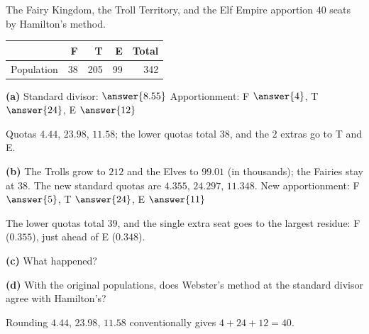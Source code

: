 \documentclass[12pt]{ximera}
\begin{document}
\begin{problem}
The Fairy Kingdom, the Troll Territory, and the Elf Empire apportion $40$ seats by
Hamilton's method.
\begin{center}
\begin{tabular}{r|rrrr}
 & F & T & E & Total\\\hline
Population & 38 & 205 & 99 & 342
\end{tabular}
\end{center}

\begin{prompt}
\textbf{(a)} Standard divisor: $\answer{8.55}$ \qquad Apportionment: F $\answer{4}$,
T $\answer{24}$, E $\answer{12}$
\begin{feedback}
Quotas $4.44$, $23.98$, $11.58$; the lower quotas total $38$, and the $2$ extras go to T
and E.
\end{feedback}
\end{prompt}

\begin{prompt}
\textbf{(b)} The Trolls grow to $212$ and the Elves to $99.01$ (in thousands); the Fairies
stay at $38$. The new standard quotas are $4.355$, $24.297$, $11.348$. New apportionment:
F $\answer{5}$, T $\answer{24}$, E $\answer{11}$
\begin{feedback}
The lower quotas total $39$, and the single extra seat goes to the largest residue: F
($0.355$), just ahead of E ($0.348$).
\end{feedback}
\end{prompt}

\begin{prompt}
\textbf{(c)} What happened?
\begin{multipleChoice}
\end{multipleChoice}
\end{prompt}

\begin{prompt}
\textbf{(d)} With the original populations, does Webster's method at the standard divisor
agree with Hamilton's? 
\begin{multipleChoice}
\end{multipleChoice}
\begin{feedback}
Rounding $4.44$, $23.98$, $11.58$ conventionally gives $4+24+12=40$.
\end{feedback}
\end{prompt}
\end{problem}
\end{document}
